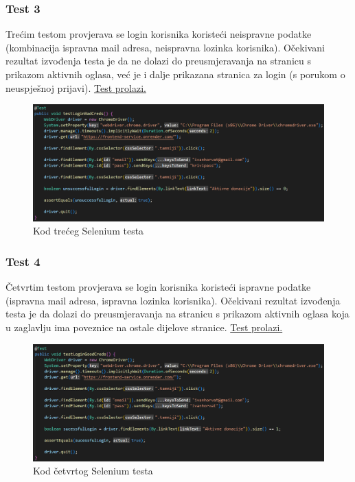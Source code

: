                 \subsubsection{Test 3}
                Trećim testom provjerava se login korisnika koristeći neispravne podatke (kombinacija ispravna mail adresa, neispravna lozinka korisnika). Očekivani rezultat izvođenja testa je da ne dolazi do preusmjeravanja na stranicu s prikazom aktivnih oglasa, već je i dalje prikazana stranica za login (s porukom o neuspješnoj prijavi). \underline{Test prolazi.}

                \begin{figure}[H]
				\includegraphics[scale=0.55]{slike/selenium3.png}
				\centering
				\caption{Kod trećeg Selenium testa}
				\label{fig:selenium3}
			\end{figure}

                \subsubsection{Test 4}
                Četvrtim testom provjerava se login korisnika koristeći ispravne podatke (ispravna mail adresa, ispravna lozinka korisnika). Očekivani rezultat izvođenja testa je da dolazi do preusmjeravanja na stranicu s prikazom aktivnih oglasa koja u zaglavlju ima poveznice na ostale dijelove stranice. \underline{Test prolazi.}

                \begin{figure}[H]
				\includegraphics[scale=0.55]{slike/selenium4.png}
				\centering
				\caption{Kod četvrtog Selenium testa}
				\label{fig:selenium4}
			\end{figure}

